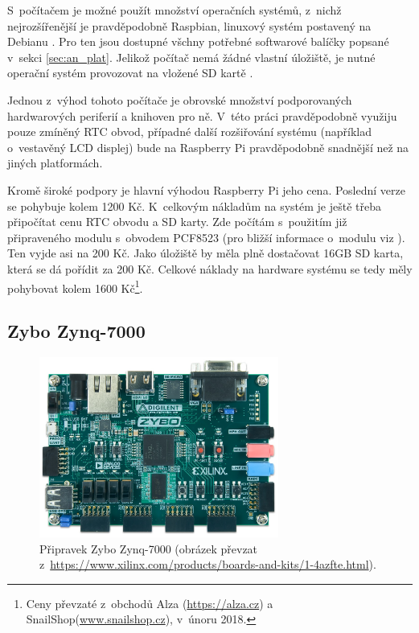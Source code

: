 S~počítačem je možné použít množství operačních systémů, z~nichž nejrozšířenější je pravděpodobně Raspbian, linuxový systém postavený na Debianu \cite{raspbian_faq}. Pro ten jsou dostupné všchny potřebné softwarové balíčky popsané v~sekci \ref{sec:an_plat}. Jelikož počítač nemá žádné vlastní úložiště, je nutné operační systém provozovat na vložené SD kartě \cite{rpi_benchoff}.

Jednou z~výhod tohoto počítače je obrovské množství podporovaných hardwarových periferií a knihoven pro ně. V~této práci pravděpodobně využiju pouze zmíněný RTC obvod, případné další rozšiřování systému (například o~vestavěný LCD displej) bude na Raspberry Pi pravděpodobně snadnější než na jiných platformách.

Kromě široké podpory je hlavní výhodou Raspberry Pi jeho cena. Poslední verze se pohybuje kolem 1200 Kč. K~celkovým nákladům na systém je ještě třeba připočítat cenu RTC obvodu a SD karty. Zde počítám s~použitím již připraveného modulu s~obvodem PCF8523 (pro bližší informace o~modulu viz \cite{rpi_rtc_ada}). Ten vyjde asi na 200 Kč. Jako úložiště by měla plně dostačovat 16GB SD karta, která se dá pořídit za 200 Kč. Celkové náklady na hardware systému se tedy měly pohybovat kolem 1600 Kč\footnote{Ceny převzaté z~obchodů Alza (\url{https://alza.cz}) a SnailShop(\url{www.snailshop.cz}), v~únoru 2018.}.

\subsection{Zybo Zynq-7000}
\label{sec:an_zyb}

\begin{figure}[h!]
    \centering
    \includegraphics[width=0.7\textwidth]{images/zybo.jpg}
    \caption[Přípravek Zybo Zynq-7000]{Připravek Zybo Zynq-7000 (obrázek převzat z~\url{https://www.xilinx.com/products/boards-and-kits/1-4azfte.html}).}
    \label{fig:zybo}
\end{figure}

